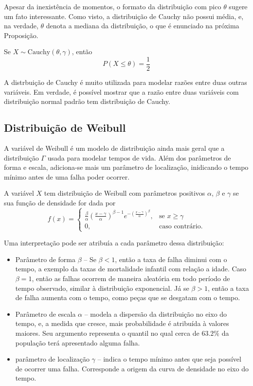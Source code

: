 Apesar da inexistência de momentos, o formato da distribuição com pico $\theta$ sugere
um fato interessante.
Como visto, a distribuição de Cauchy não possui média, e, na verdade, $\theta$ denota
a mediana da distribuição, o que é enunciado na próxima Proposição.

\begin{prop:mediana de cauchy}
Se $X \sim \mathrm{Cauchy}(\theta, \gamma)$, então
\[
    P(X \le \theta) = \frac 1 2
\]
\end{prop:mediana de cauchy}

A distrbuição de Cauchy é muito utilizada para modelar razões entre duas outras variáveis.
Em verdade, é possível mostrar que a razão entre duas variáveis com distribuição normal
padrão tem distribuição de Cauchy.

\subsection{Distribuição de Weibull}

A variável de Weibull é um modelo de distribuição ainda mais geral que a distribuição
$\Gamma$ usada para modelar tempos de vida. Além dos parâmetros de forma e escala,
adiciona-se mais um parâmetro de localização, inidicando o tempo mínimo antes de uma
falha poder ocorrer.

\begin{def:weilbull}
A variável $X$ tem distribuição de Weibull com parâmetros positivos $\alpha$, $\beta$ e
$\gamma$ se sua função de densidade for dada por
\[
    f(x) = \begin{cases}
        \frac \beta \alpha \left(\frac{x - \gamma}{\alpha}\right)^{\beta - 1} e^{-\left(\frac{x - \gamma}{\alpha}\right)^{\beta}},&\text{se } x \ge \gamma \\
        0,&\text{caso contrário.}
    \end{cases}
\]
\end{def:weilbull}

Uma interpretação pode ser atribuía a cada parâmetro dessa distribuição:
\begin{itemize}
\item Parâmetro de forma $\beta$ -- Se $\beta < 1$, então a taxa de falha diminui com o
tempo, a exemplo da taxas de mortalidade infantil com relação a idade.
Caso $\beta = 1$, então as falhas ocorrem de maneira aleatória em todo período de tempo
observado, similar à distribuição exponencial.
Já se $\beta > 1$, então a taxa de falha aumenta com o tempo, como peças que se desgatam
com o tempo.

\item Parâmetro de escala $\alpha$ -- modela a dispersão da distribuição no eixo do tempo,
e, a medida que cresce, mais probabilidade é atribuída à valores maiores.
Seu argumento representa o quantil no qual cerca de $63.2\%$ da população terá apresentado
alguma falha.

\item parâmetro de localização $\gamma$ -- indica o tempo mínimo antes que seja possível
de ocorrer uma falha.
Corresponde a origem da curva de densidade no eixo do tempo.
\end{itemize}

